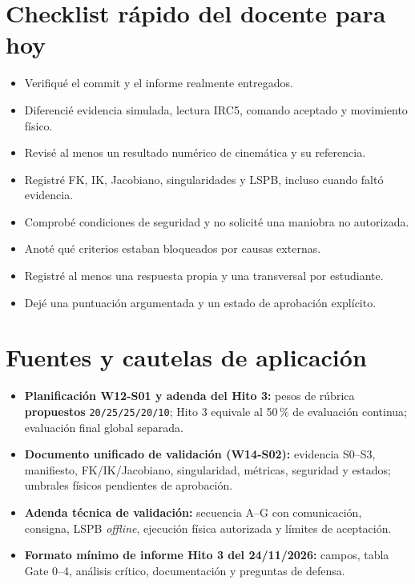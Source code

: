 \documentclass[10pt, a4paper]{article}
\begin{document}
\section{Checklist rápido del docente para hoy}

\begin{itemize}
    \setlength{\itemsep}{3pt}\setlength{\parskip}{0pt}
    \footnotesize
    \item[$\square$] Verifiqué el commit y el informe realmente entregados.
    \item[$\square$] Diferencié evidencia simulada, lectura IRC5, comando aceptado y movimiento físico.
    \item[$\square$] Revisé al menos un resultado numérico de cinemática y su referencia.
    \item[$\square$] Registré FK, IK, Jacobiano, singularidades y LSPB, incluso cuando faltó evidencia.
    \item[$\square$] Comprobé condiciones de seguridad y no solicité una maniobra no autorizada.
    \item[$\square$] Anoté qué criterios estaban bloqueados por causas externas.
    \item[$\square$] Registré al menos una respuesta propia y una transversal por estudiante.
    \item[$\square$] Dejé una puntuación argumentada y un estado de aprobación explícito.
\end{itemize}

\section{Fuentes y cautelas de aplicación}

\begin{itemize}
    \setlength{\itemsep}{2pt}\setlength{\parskip}{0pt}
    \footnotesize
    \item \textbf{Planificación W12-S01 y adenda del Hito 3:} pesos de rúbrica \textbf{propuestos} \texttt{20/25/25/20/10}; Hito 3 equivale al 50\,\% de evaluación continua; evaluación final global separada.
    \item \textbf{Documento unificado de validación (W14-S02):} evidencia S0--S3, manifiesto, FK/IK/Jacobiano, singularidad, métricas, seguridad y estados; umbrales físicos pendientes de aprobación.
    \item \textbf{Adenda técnica de validación:} secuencia A--G con comunicación, consigna, LSPB \textit{offline}, ejecución física autorizada y límites de aceptación.
    \item \textbf{Formato mínimo de informe Hito 3 del 24/11/2026:} campos, tabla Gate 0--4, análisis crítico, documentación y preguntas de defensa.
\end{itemize}
\end{document}
